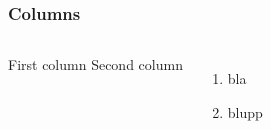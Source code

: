 \begin{frame}
  \frametitle{Columns}

  \begin{columns}
    First column
		Second column
    \begin{enumerate}
    \item bla
    \item blupp
    \end{enumerate}
  \end{columns}

\end{frame}
